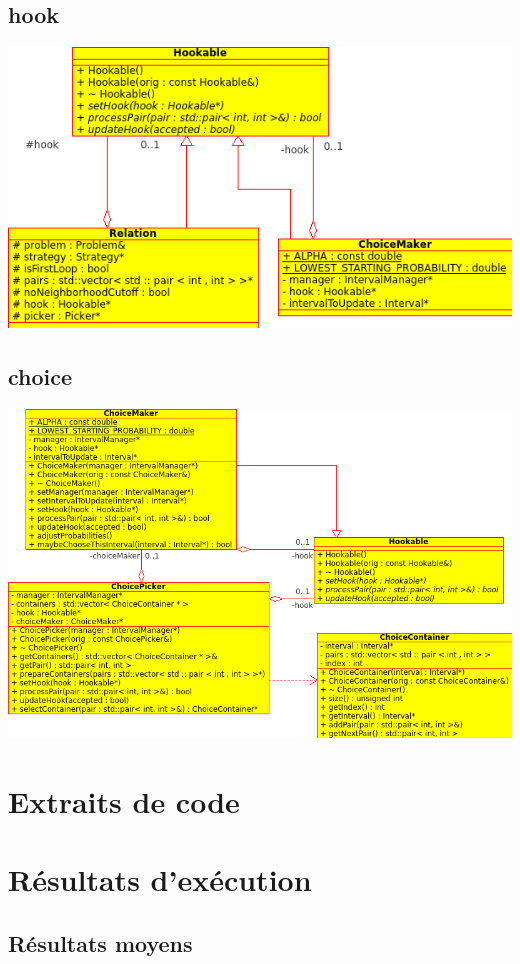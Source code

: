 \documentclass[a4paper,10pt]{report}
\begin{document}
\section{hook}
\includegraphics[width=\textwidth]{../UML/hook.png}

\section{choice}
\includegraphics[width=\textwidth]{../UML/choice.png}

\chapter{Extraits de code}

\chapter{Résultats d'exécution}

\section{Résultats moyens}
\end{document}
